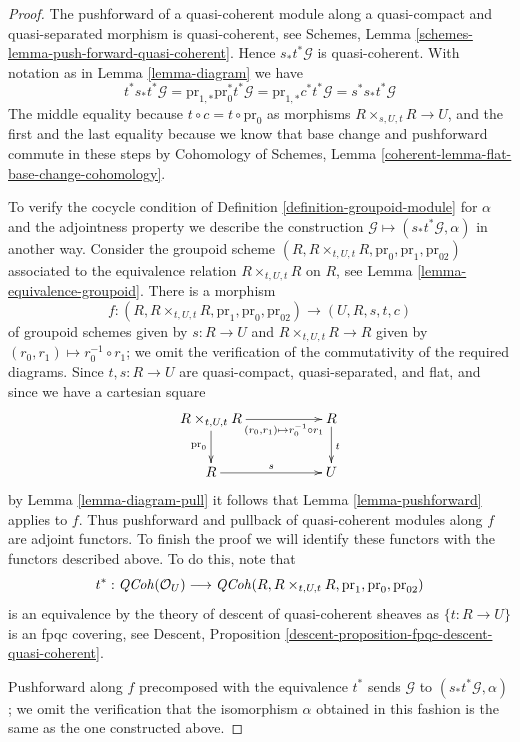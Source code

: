 \begin{proof}
The pushforward of a quasi-coherent module along a quasi-compact and
quasi-separated morphism is quasi-coherent, see Schemes, Lemma
\ref{schemes-lemma-push-forward-quasi-coherent}. Hence $s_*t^*\mathcal{G}$
is quasi-coherent. With notation as in Lemma \ref{lemma-diagram} we have
$$
t^*s_*t^*\mathcal{G} =
\text{pr}_{1, *}\text{pr}_0^*t^*\mathcal{G} =
\text{pr}_{1, *}c^*t^*\mathcal{G} =
s^*s_*t^*\mathcal{G}
$$
The middle equality because $t \circ c = t \circ \text{pr}_0$ as
morphisms $R \times_{s, U, t} R \to U$, and the first and the last
equality because we know that base change and pushforward commute in
these steps by Cohomology of Schemes, Lemma
\ref{coherent-lemma-flat-base-change-cohomology}.

\medskip\noindent
To verify the cocycle condition of Definition \ref{definition-groupoid-module}
for $\alpha$ and the adjointness property we describe the construction
$\mathcal{G} \mapsto (s_*t^*\mathcal{G}, \alpha)$ in another way.
Consider the groupoid scheme
$(R, R \times_{t, U, t} R, \text{pr}_0, \text{pr}_1, \text{pr}_{02})$
associated to the equivalence relation $R \times_{t, U, t} R$
on $R$, see Lemma \ref{lemma-equivalence-groupoid}.
There is a morphism
$$
f :
(R, R \times_{t, U, t} R, \text{pr}_1, \text{pr}_0, \text{pr}_{02})
\longrightarrow
(U, R, s, t, c)
$$
of groupoid schemes given by $s : R \to U$ and $R \times_{t, U, t} R \to R$
given by $(r_0, r_1) \mapsto r_0^{-1} \circ r_1$; we omit the verification
of the commutativity of the required diagrams. Since
$t, s : R \to U$ are quasi-compact, quasi-separated, and flat,
and since we have a cartesian square
$$
\xymatrix{
R \times_{t, U, t} R \ar[d]_{\text{pr}_0}
\ar[rr]_-{(r_0, r_1) \mapsto r_0^{-1} \circ r_1} & & R \ar[d]^t \\
R \ar[rr]^s & & U
}
$$
by Lemma \ref{lemma-diagram-pull} it follows that
Lemma \ref{lemma-pushforward} applies to $f$.
Thus pushforward and pullback of quasi-coherent modules along
$f$ are adjoint functors. To finish the proof we will identify these functors
with the functors described above. To do this, note that
$$
t^* :
\mathit{QCoh}(\mathcal{O}_U)
\longrightarrow
\mathit{QCoh}(R, R \times_{t, U, t} R, \text{pr}_1, \text{pr}_0, \text{pr}_{02})
$$
is an equivalence by the theory of descent of quasi-coherent sheaves as
$\{t : R \to U\}$ is an fpqc covering, see
Descent, Proposition \ref{descent-proposition-fpqc-descent-quasi-coherent}.

\medskip\noindent
Pushforward along $f$ precomposed with the equivalence $t^*$ sends
$\mathcal{G}$ to $(s_*t^*\mathcal{G}, \alpha)$;
we omit the verification that the isomorphism $\alpha$
obtained in this fashion is the same as the one constructed above.


\end{proof}
